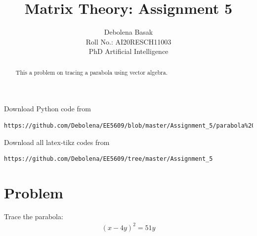 \documentclass[journal,12pt,twocolumn]{IEEEtran}
\begin{document}
\makeatletter
{}
\makeatother
\let\StandardTheFigure\thefigure
\let\vec\mathbf
\renewcommand{\thefigure}{\theproblem}
\def\putbox#1#2#3{\makebox[0in][l]{\makebox[#1][l]{}\raisebox{\baselineskip}[0in][0in]{\raisebox{#2}[0in][0in]{#3}}}}
     \def\rightbox#1{\makebox[0in][r]{#1}}
     \def\centbox#1{\makebox[0in]{#1}}
     \def\topbox#1{\raisebox{-\baselineskip}[0in][0in]{#1}}
     \def\midbox#1{\raisebox{-0.5\baselineskip}[0in][0in]{#1}}
\vspace{3cm}
\title{Matrix Theory: Assignment 5}
\author{Debolena Basak\\ Roll No.: AI20RESCH11003\\ PhD Artificial Intelligence}

\maketitle
\newpage
\bigskip
\renewcommand{\thefigure}{\theenumi}
\renewcommand{\thetable}{\theenumi}


\begin{abstract}
This a problem on tracing a parabola using vector algebra.
\end{abstract}
Download Python code from 
%
\begin{lstlisting}
https://github.com/Debolena/EE5609/blob/master/Assignment_5/parabola%20plot.py
\end{lstlisting}
%
Download all latex-tikz codes from 
%
\begin{lstlisting}
https://github.com/Debolena/EE5609/tree/master/Assignment_5
\end{lstlisting}
%
\section{Problem}
Trace the parabola:
\begin{align}
	(x-4y)^2=51y
\end{align}
\end{document}
